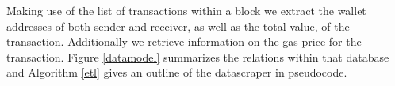 Making use of the list of transactions within a block we extract the wallet addresses of both sender and receiver, as well as the total value, of the transaction. Additionally we retrieve information on the gas price for the transaction. {Figure \ref{datamodel}} summarizes the relations within that database and {Algorithm \ref{etl}} gives an outline of the datascraper in pseudocode.
